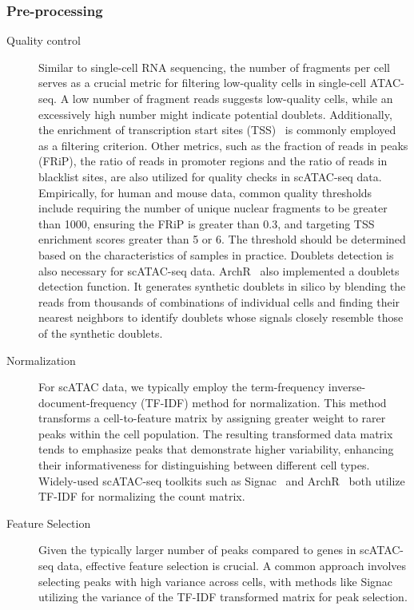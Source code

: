 \subsubsection{Pre-processing}
\begin{description}
	\item[Quality control]
	Similar to single-cell RNA sequencing, the number of fragments per cell serves as a crucial metric for filtering low-quality cells in single-cell ATAC-seq. A low number of fragment reads suggests low-quality cells, while an excessively high number might indicate potential doublets. Additionally, the enrichment of transcription start sites (TSS)~\citep{Granja2021} is commonly employed as a filtering criterion. Other metrics, such as the fraction of reads in peaks (FRiP), the ratio of reads in promoter regions and the ratio of reads in blacklist sites, are also utilized for quality checks in scATAC-seq data. Empirically, for human and mouse data, common quality thresholds include requiring the number of unique nuclear fragments to be greater than 1000, ensuring the FRiP is greater than 0.3, and targeting TSS enrichment scores greater than 5 or 6. The threshold should be determined based on the characteristics of samples in practice. Doublets detection is also necessary for scATAC-seq data. ArchR~\citep{Granja2021} also implemented a doublets detection function. It generates synthetic doublets in silico by blending the reads from thousands of combinations of individual cells and finding their nearest neighbors to identify doublets whose signals closely resemble those of the synthetic doublets.

	\item[Normalization]
	For scATAC data, we typically employ the term-frequency inverse-document-frequency (TF-IDF) method for normalization. This method transforms a cell-to-feature
	matrix by assigning greater weight to rarer peaks within the cell population. The resulting transformed data matrix tends to emphasize peaks that demonstrate higher variability, enhancing their informativeness for distinguishing between different cell types. Widely-used scATAC-seq toolkits such as Signac~\citep{signac} and ArchR~\citep{granja2019single} both utilize TF-IDF for normalizing the count matrix.


	\item[Feature Selection]
	Given the typically larger number of peaks compared to genes in scATAC-seq data, effective feature selection is crucial. A common approach involves selecting peaks with high variance across cells, with methods like Signac~\citep{signac} utilizing the variance of the TF-IDF transformed matrix for peak selection.
\end{description}
